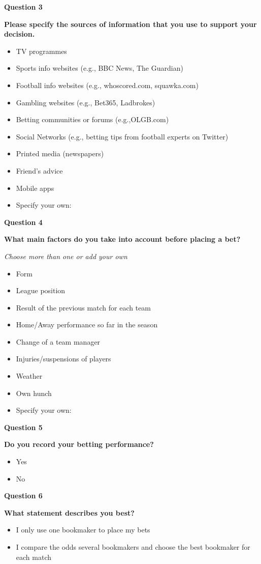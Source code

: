 \textbf{Question 3}\par
\textbf{Please specify the sources of information that you use to support your decision.}
 \begin{itemize}
	 \item TV programmes
	 \item Sports info websites (e.g., BBC News, The Guardian)
	 \item Football info websites (e.g., whoscored.com, squawka.com)
	 \item Gambling websites (e.g., Bet365, Ladbrokes)
	 \item Betting communities or forums (e.g.,OLGB.com)
	 \item Social Networks (e.g., betting tips from football experts on Twitter)
	 \item Printed media (newspapers)
	 \item Friend's advice
	 \item Mobile apps
	 \item Specify your own: 
\end{itemize}
  
\textbf{Question 4}\par
\textbf{What main factors do you take into account before placing a bet?}\par
\emph{Choose more than one or add your own}
 \begin{itemize}
	 \item Form
	 \item League position
	 \item Result of the previous match for each team
	 \item Home/Away performance so far in the season
     \item Change of a team manager
     \item Injuries/suspensions of players
	 \item Weather
	 \item Own hunch
	 \item Specify your own: 
\end{itemize}
 
\textbf{Question 5}\par
\textbf{Do you record your betting performance?}
\begin{itemize} 
 \item Yes
 \item No
\end{itemize}

\textbf{Question 6}\par
\textbf{What statement describes you best?}
 \begin{itemize}
 	\item I only use one bookmaker to place my bets
	\item I compare the odds several bookmakers and choose the best bookmaker for each match
\end{itemize}
 
